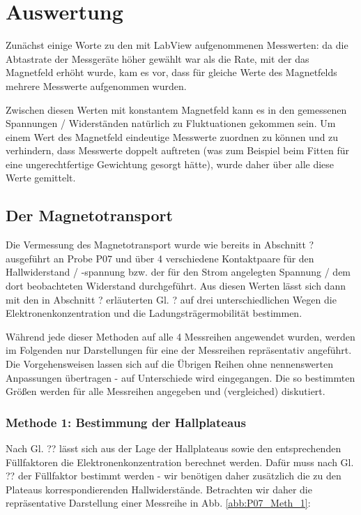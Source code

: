\section{Auswertung}

Zunächst einige Worte zu den mit LabView aufgenommenen Messwerten: da die Abtastrate der Messgeräte höher gewählt war als die Rate, mit der das Magnetfeld erhöht wurde, kam es vor, dass für gleiche Werte des Magnetfelds mehrere Messwerte aufgenommen wurden.

Zwischen diesen Werten mit konstantem Magnetfeld kann es in den gemessenen Spannungen / Widerständen natürlich zu Fluktuationen gekommen sein. Um einem Wert des Magnetfeld eindeutige Messwerte zuordnen zu können und zu verhindern, dass Messwerte doppelt auftreten (was zum Beispiel beim Fitten für eine ungerechtfertige Gewichtung gesorgt hätte), wurde daher über alle diese Werte gemittelt.

\subsection{Der Magnetotransport}
Die Vermessung des Magnetotransport wurde wie bereits in Abschnitt ? ausgeführt an Probe P07 und über 4 verschiedene Kontaktpaare für den Hallwiderstand / -spannung bzw. der für den Strom angelegten Spannung / dem dort beobachteten Widerstand durchgeführt. Aus diesen Werten lässt sich dann mit den in Abschnitt ? erläuterten Gl. ? auf drei unterschiedlichen Wegen die Elektronenkonzentration und die Ladungsträgermobilität bestimmen. 

Während jede dieser Methoden auf alle 4 Messreihen angewendet wurden, werden im Folgenden nur Darstellungen für eine der Messreihen repräsentativ angeführt. Die Vorgehensweisen lassen sich auf die Übrigen Reihen ohne nennenswerten Anpassungen übertragen - auf Unterschiede wird eingegangen. Die so bestimmten Größen werden für alle Messreihen angegeben und (vergleiched) diskutiert.

\subsubsection{Methode 1: Bestimmung der Hallplateaus}
Nach Gl. ?? lässt sich aus der Lage der Hallplateaus sowie den entsprechenden Füllfaktoren die Elektronenkonzentration berechnet werden. Dafür muss nach Gl. ?? der Füllfaktor bestimmt werden - wir benötigen daher zusätzlich die zu den Plateaus korrespondierenden Hallwiderstände.  Betrachten wir daher die repräsentative Darstellung einer Messreihe in Abb. \ref{abb:P07_Meth_1}:

